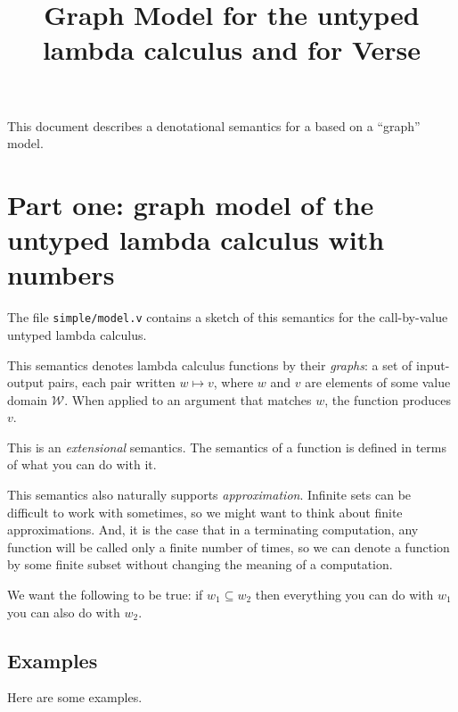 \documentclass{article}
\title{Graph Model for the untyped lambda calculus and for 
Verse}
\theoremstyle{definition}
\begin{document}
\maketitle

This document describes a denotational semantics for a
based on a ``graph'' model. 

\newcommand\inhabited[1]{\ensuremath{\mathit{inhabited}}\ {#1}}
\newcommand\apply[2]{\ensuremath{{#1}\ \blacksquare\ {#2}}}

\section{Part one: graph model of the untyped lambda calculus with numbers}

The file \texttt{simple/model.v} contains a sketch of this semantics for the
call-by-value untyped lambda calculus.

This semantics denotes lambda calculus functions by their \emph{graphs}: a
set of input-output pairs, each pair written $w \mapsto v$, where $w$ and $v$
are elements of some value domain $\mathcal{W}$. When applied to an argument
that matches $w$, the function produces $v$.

This is an \emph{extensional} semantics. The semantics of a function is
defined in terms of what you can do with it. 

This semantics also naturally supports \emph{approximation}. Infinite sets can
be difficult to work with sometimes, so we might want to think about finite
approximations. And, it is the case that in a terminating computation, any
function will be called only a finite number of times, so we can denote a
function by some finite subset without changing the meaning of a computation.

We want the following to be true: if $w_1 \subseteq w_2$ then everything you can 
do with $w_1$ you can also do with $w_2$. 


\subsection{Examples}

Here are some examples.
\end{document}
